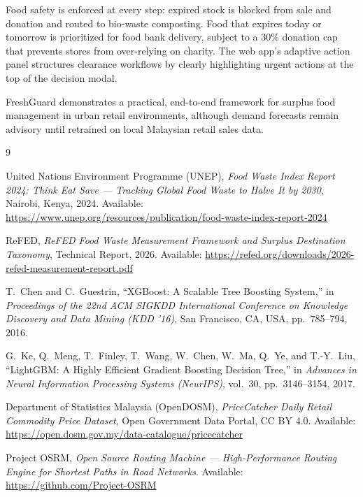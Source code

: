\documentclass[12pt,a4paper]{article}
\renewcommand{\_}{\oldunderscore\allowbreak}
\begin{document}
Food safety is enforced at every step: expired stock is blocked from sale and donation and routed to bio-waste composting. Food that expires today or tomorrow is prioritized for food bank delivery, subject to a 30\% donation cap that prevents stores from over-relying on charity. The web app's adaptive action panel structures clearance workflows by clearly highlighting urgent actions at the top of the decision modal.

FreshGuard demonstrates a practical, end-to-end framework for surplus food management in urban retail environments, although demand forecasts remain advisory until retrained on local Malaysian retail sales data.

\begin{thebibliography}{9}

United Nations Environment Programme (UNEP), \emph{Food Waste Index Report 2024: Think Eat Save --- Tracking Global Food Waste to Halve It by 2030}, Nairobi, Kenya, 2024. Available: \url{https://www.unep.org/resources/publication/food-waste-index-report-2024}

ReFED, \emph{ReFED Food Waste Measurement Framework and Surplus Destination Taxonomy}, Technical Report, 2026. Available: \url{https://refed.org/downloads/2026-refed-measurement-report.pdf}

T.~Chen and C.~Guestrin, ``XGBoost: A Scalable Tree Boosting System,'' in \emph{Proceedings of the 22nd ACM SIGKDD International Conference on Knowledge Discovery and Data Mining (KDD '16)}, San Francisco, CA, USA, pp.~785--794, 2016.

G.~Ke, Q.~Meng, T.~Finley, T.~Wang, W.~Chen, W.~Ma, Q.~Ye, and T.-Y.~Liu, ``LightGBM: A Highly Efficient Gradient Boosting Decision Tree,'' in \emph{Advances in Neural Information Processing Systems (NeurIPS)}, vol.~30, pp.~3146--3154, 2017.

Department of Statistics Malaysia (OpenDOSM), \emph{PriceCatcher Daily Retail Commodity Price Dataset}, Open Government Data Portal, CC BY 4.0. Available: \url{https://open.dosm.gov.my/data-catalogue/pricecatcher}

Project OSRM, \emph{Open Source Routing Machine --- High-Performance Routing Engine for Shortest Paths in Road Networks}. Available: \url{https://github.com/Project-OSRM}

\end{thebibliography}
\end{document}
